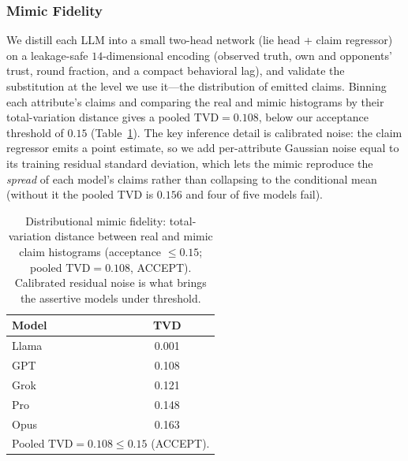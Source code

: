 \subsubsection{Mimic Fidelity}
\label{sec:dec-r-fidelity}
We distill each LLM into a small two-head network (lie head + claim regressor) on
a leakage-safe $14$-dimensional encoding (observed truth, own and opponents'
trust, round fraction, and a compact behavioral lag), and validate the
substitution at the level we use it---the distribution of emitted claims. Binning
each attribute's claims and comparing the real and mimic histograms by their
total-variation distance gives a pooled $\mathrm{TVD}=0.108$, below our
acceptance threshold of $0.15$ (Table~\ref{tab:dec-r-fidelity}). The key
inference detail is calibrated noise: the claim regressor emits a point estimate,
so we add per-attribute Gaussian noise equal to its training residual standard
deviation, which lets the mimic reproduce the \emph{spread} of each model's
claims rather than collapsing to the conditional mean (without it the pooled TVD
is $0.156$ and four of five models fail).

\begin{table}[htbp]
\caption{Distributional mimic fidelity: total-variation distance between real and mimic claim histograms (acceptance $\leq 0.15$; pooled $\mathrm{TVD}=0.108$, ACCEPT). Calibrated residual noise is what brings the assertive models under threshold.}
\label{tab:dec-r-fidelity}
\centering
\begin{tabular}{lc}
\hline
Model & TVD \\
\hline
Llama   & 0.001 \\
GPT     & 0.108 \\
Grok    & 0.121 \\
Pro     & 0.148 \\
Opus    & 0.163 \\
\hline
\multicolumn{2}{l}{Pooled $\mathrm{TVD}=0.108 \le 0.15$ (ACCEPT).} \\
\hline
\end{tabular}
\end{table}


